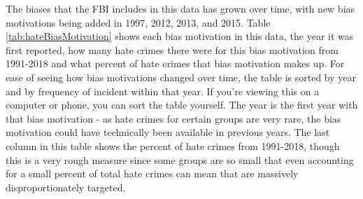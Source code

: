 \documentclass[
  12pt,
  openany]{book}
\begin{document}
The biases that the FBI includes in this data has grown over time, with new bias motivations being added in 1997, 2012, 2013, and 2015. Table \ref{tab:hateBiasMotivation} shows each bias motivation in this data, the year it was first reported, how many hate crimes there were for this bias motivation from 1991-2018 and what percent of hate crimes that bias motivation makes up. For ease of seeing how bias motivations changed over time, the table is sorted by year and by frequency of incident within that year. If you're viewing this on a computer or phone, you can sort the table yourself. The year is the first year with that bias motivation - as hate crimes for certain groups are very rare, the bias motivation could have technically been available in previous years. The last column in this table shows the percent of hate crimes from 1991-2018, though this is a very rough measure since some groups are so small that even accounting for a small percent of total hate crimes can mean that are massively disproportionately targeted.
\end{document}
